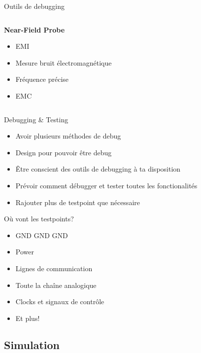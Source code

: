 \begin{frame}[t]{Outils de debugging}
\begin{columns}[T]
        \begin{column}{0.33\textwidth}
            \vspace{-12pt}
            \begin{center}
                \textbf{Near-Field Probe}
            \end{center}
            \begin{itemize}
                \item EMI
                \bigskip
                \item Mesure bruit électromagnétique
                \item Fréquence précise
                \item EMC
            \end{itemize}
        \end{column}
    \end{columns}
    \vspace{-0.25\textwidth}
    \begin{columns}
        \begin{column}{0.33\textwidth}
        \end{column}
        \begin{column}{0.33\textwidth}
        \end{column}
        \begin{column}{0.33\textwidth}
        \end{column}
    \end{columns}
\end{frame}

\begin{frame}{Debugging \& Testing}
    \begin{itemize}
        \item Avoir plusieurs méthodes de debug
        \item Design pour pouvoir être debug
        \item Être conscient des outils de debugging à ta disposition
        \item Prévoir comment débugger et tester toutes les fonctionalités
        \bigskip
        \item Rajouter plus de testpoint que nécessaire
    \end{itemize}
\end{frame}

\begin{frame}{Où vont les testpoints?}
    \begin{itemize}
        \item GND GND GND
        \item Power
        \item Lignes de communication
        \item Toute la chaîne analogique
        \item Clocks et signaux de contrôle
        \item Et plus!
    \end{itemize}
\end{frame}

\subsection{Simulation}